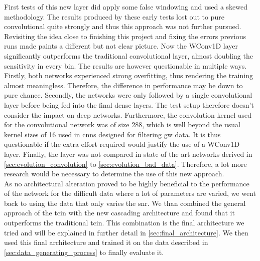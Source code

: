First tests of this new layer did apply some false windowing and used a skewed methodology. The results produced by these early tests lost out to pure convolutional quite strongly and thus this approach was not further pursued. Revisiting the idea close to finishing this project and fixing the errors previous runs made paints a different but not clear picture. Now the WConv1D layer significantly outperforms the traditional convolutional layer, almost doubling the sensitivity in every bin. The results are however questionable in multiple ways. Firstly, both networks experienced strong overfitting, thus rendering the training almost meaningless. Therefore, the difference in performance may be down to pure chance. Secondly, the networks were only followed by a single convolutional layer before being fed into the final dense layers. The test setup therefore doesn't consider the impact on deep networks. Furthermore, the convolution kernel used for the convolutional network was of size 288, which is well beyond the usual kernel sizes of 16 used in \gls{cnn}s designed for filtering \gls{gw} data. It is thus questionable if the extra effort required would justify the use of a WConv1D layer. Finally, the layer was not compared in state of the art networks derived in \autoref{sec:evolution_convolution} to \autoref{sec:evolution_bad_data}. Therefore, a lot more research would be necessary to determine the use of this new approach.\medskip\\
As no architectural alteration proved to be highly beneficial to the performance of the network for the difficult data where a lot of parameters are varied, we went back to using the data that only varies the \gls{snr}. We than combined the general approach of the \gls{tcin} with the new cascading architecture and found that it outperforms the traditional \gls{tcin}. This combination is the final architecture we tried and will be explained in further detail in \autoref{sec:final_architecture}. We then used this final architecture and trained it on the data described in \autoref{sec:data_generating_process} to finally evaluate it.


